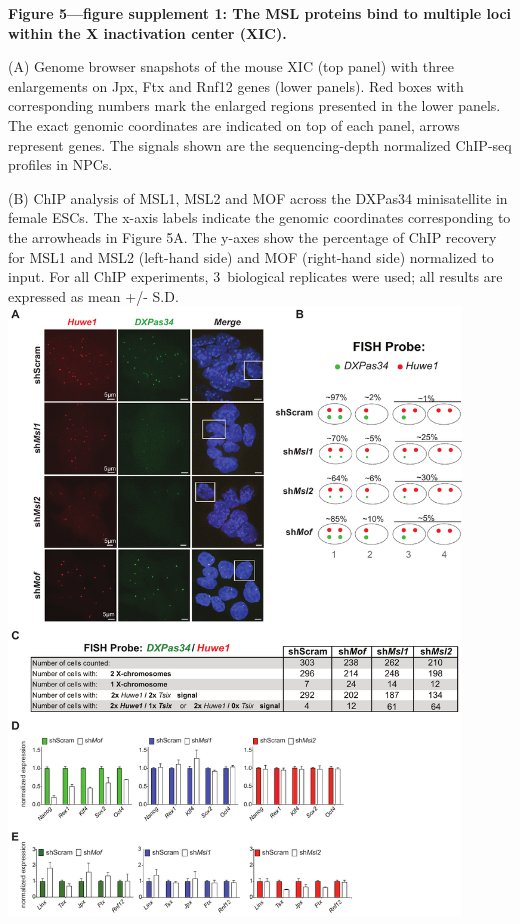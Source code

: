 \begin{footnotesize}
\begin{sffamily}
\begin{singlespacing}
\textbf{Figure 5—figure supplement 1: The MSL proteins bind to multiple loci within the X inactivation center (XIC).}

(A) Genome browser snapshots of the mouse XIC (top panel) with three enlargements on Jpx, Ftx and Rnf12 genes (lower panels). Red boxes with corresponding numbers mark the enlarged regions presented in the lower panels. The exact genomic coordinates are indicated on top of each panel, arrows represent genes. The signals shown are the sequencing-depth normalized ChIP-seq profiles in NPCs.

(B) ChIP analysis of MSL1, MSL2 and MOF across the DXPas34 mini\-sat\-el\-lite in female ESCs. The x-axis labels indicate the genomic coordinates corresponding to the arrowheads in Figure 5A. The y-axes show the percentage of ChIP recovery for MSL1 and MSL2 (left-hand side) and MOF (right-hand side) normalized to input. For all ChIP experiments, 3~biological replicates were used; all results are expressed as mean +/- S.D.
\newpage
\includegraphics[width=0.9\textwidth]{Figures/Appendix/Figure6_supplemental_figure1_scissored.pdf}


\end{singlespacing}
\end{sffamily}
\end{footnotesize}

